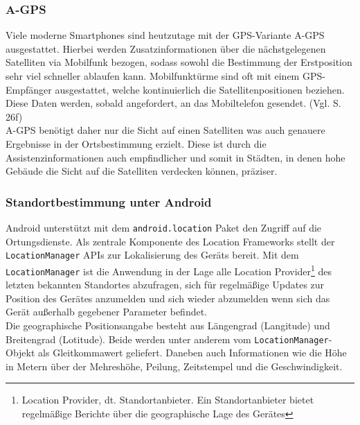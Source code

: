 \subsubsection{\gls{A-GPS}}
Viele moderne \glspl{Smartphone} sind heutzutage mit der \gls{GPS}-Variante \gls{A-GPS} ausgestattet. Hierbei werden Zusatzinformationen über die nächstgelegenen Satelliten via Mobilfunk bezogen, sodass sowohl die Bestimmung der Erstposition sehr viel schneller ablaufen kann. Mobilfunktürme sind oft mit einem \gls{GPS}-Empfänger ausgestattet, welche kontinuierlich die Satellitenpositionen beziehen. Diese Daten werden, sobald angefordert, an das Mobiltelefon gesendet. (Vgl. \cite{gps} S. 26f) \\
\gls{A-GPS} benötigt daher nur die Sicht auf einen Satelliten was auch genauere Ergebnisse in der Ortsbestimmung erzielt. Diese ist durch die Assistenzinformationen auch empfindlicher und somit in Städten, in denen hohe Gebäude die Sicht auf die Satelliten verdecken können, präziser.   
\subsubsection{Standortbestimmung unter Android}
Android unterstützt mit dem \texttt{android.location} Paket den Zugriff auf die Ortungsdienste. Als zentrale Komponente des Location Frameworks stellt der \texttt{LocationManager} \glspl{API} zur Lokalisierung des Geräts bereit. Mit dem \texttt{LocationManager} ist die Anwendung in der Lage alle Location Provider\footnote{ Location Provider, dt. Standortanbieter. Ein Standortanbieter bietet regelmäßige Berichte über die geographische Lage des Gerätes} des letzten bekannten Standortes abzufragen, sich für regelmäßige Updates zur Position des Gerätes anzumelden und sich wieder abzumelden wenn sich das Gerät außerhalb gegebener Parameter befindet. \cite{android_gps} \\
Die geographische Positionsangabe besteht aus Längengrad (Langitude) und Breitengrad (Lotitude). Beide werden unter anderem vom \texttt{LocationManager}-Objekt als Gleitkommawert geliefert. Daneben auch Informationen wie die Höhe in Metern über der Mehreshöhe, Peilung, Zeitstempel und die Geschwindigkeit.
\clearpage
